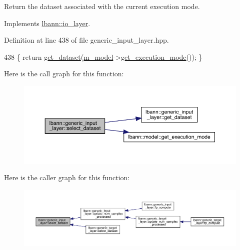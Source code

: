 Return the dataset associated with the current execution mode. 

Implements \hyperlink{classlbann_1_1io__layer_a66acbfb9c03a2e89a751b420416ae3bf}{lbann\+::io\+\_\+layer}.



Definition at line 438 of file generic\+\_\+input\+\_\+layer.\+hpp.


\begin{DoxyCode}
438 \{ \textcolor{keywordflow}{return} \hyperlink{classlbann_1_1generic__input__layer_af5699540797c22d8846028e578a6fc59}{get\_dataset}(\hyperlink{classlbann_1_1Layer_a3d9315e99574166f2f33e37b572021d2}{m\_model}->\hyperlink{classlbann_1_1model_addb40597cf29aa6d31b6a7d09ef48608}{get\_execution\_mode}()); \}
\end{DoxyCode}
Here is the call graph for this function\+:\nopagebreak
\begin{figure}[H]
\begin{center}
\leavevmode
\includegraphics[width=350pt]{classlbann_1_1generic__input__layer_a654365ee97a64c75a547cfb7ef329304_cgraph}
\end{center}
\end{figure}
Here is the caller graph for this function\+:\nopagebreak
\begin{figure}[H]
\begin{center}
\leavevmode
\includegraphics[width=350pt]{classlbann_1_1generic__input__layer_a654365ee97a64c75a547cfb7ef329304_icgraph}
\end{center}
\end{figure}
\mbox{\label{classlbann_1_1generic__input__layer_ab8468d077867b03098bbc71a38edaa15}} 
